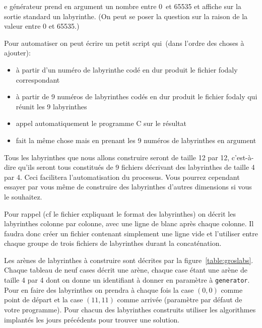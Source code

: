 \documentclass[a4paper]{article}
\newenvironment{enseignants}[1]{\noindent\color{blue}{\bf #1}}{}
\begin{document}
\begin{enseignants}
  Le générateur prend en argument un nombre entre 0 et 65535 et affiche sur la sortie standard un labyrinthe. (On peut se poser la question sur la raison de la valeur entre 0 et 65535.)

  Pour automatiser on peut écrire un petit script qui (dans l'ordre des choses à ajouter):
  \begin{itemize}
    \item à partir d'un numéro de labyrinthe codé en dur produit le fichier fodaly correspondant
    \item à partir de 9 numéros de labyrinthes codés en dur produit le fichier fodaly qui réunit les 9 labyrinthes
    \item appel automatiquement le programme C sur le résultat
    \item fait la même chose mais en prenant les 9 numéros de labyrinthes en argument
  \end{itemize}

\end{enseignants}

Tous les labyrinthes que nous allons construire seront de taille 12 par 12, c'est-à-dire qu'ils seront tous constitués de 9 fichiers décrivant des labyrinthes de taille 4 par 4. Ceci facilitera l'automatisation du processus. Vous pourrez cependant essayer par vous même de construire des labyrinthes d'autres dimensions si vous le souhaitez.

\begin{enseignants}{Attention}
Pour rappel (cf le fichier expliquant le format des labyrinthes) on décrit les labyrinthes colonne par colonne, avec une ligne de blanc après chaque colonne. Il faudra donc créer un fichier contenant simplement une ligne vide et l'utiliser entre chaque groupe de trois fichiers de labyrinthes durant la concaténation.
\end{enseignants}

Les arènes de labyrinthes à construire sont décrites par la figure~\ref{table:groslabs}.
Chaque tableau de neuf cases décrit une arène, chaque case étant une arène de taille 4 par 4 dont on donne un identifiant à donner en paramètre à \verb|generator|.
Pour en faire des labyrinthes on prendra à chaque fois la case $(0,0)$ comme point de départ et la case $(11,11)$ comme arrivée (paramètre par défaut de votre programme).
Pour chacun des labyrinthes construits utiliser les algorithmes implantés les jours précédents pour trouver une solution.
\end{document}
